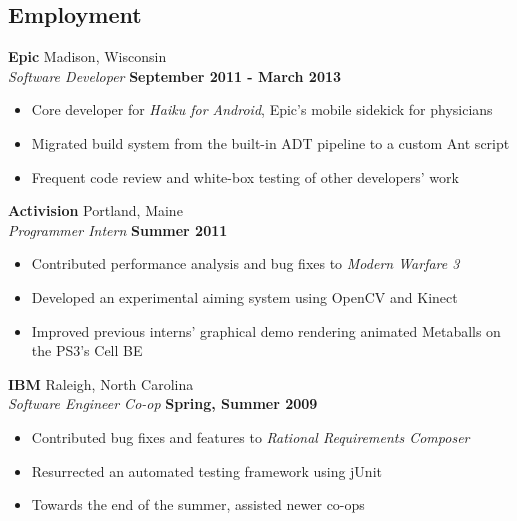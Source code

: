 \documentclass[line,margin]{res}
\begin{document}
 

\address{brendan@luchenlabs.com}
\address{{www.luchenlabs.com}}

                                  
\begin{resume}

 
\section{\sc Employment}
    \textbf{Epic} \hfill Madison, Wisconsin  \\
    \textit{Software Developer} \hfill \textbf{September 2011 - March 2013}
    \vspace{0.05in}
    \begin{itemize}
        \item Core developer for \textit{Haiku for Android}, Epic's mobile sidekick for physicians
        \item Migrated build system from the built-in ADT pipeline to a custom Ant script
        \item Frequent code review and white-box testing of other developers' work
    \end{itemize}

    \textbf{Activision} \hfill Portland, Maine  \\
    \textit{Programmer Intern} \hfill \textbf{Summer 2011}
    \vspace{0.05in}
    \begin{itemize}
        \item Contributed performance analysis and bug fixes to \textit{Modern Warfare 3}
        \item Developed an experimental aiming system using OpenCV and Kinect
        \item Improved previous interns' graphical demo rendering animated Metaballs on the PS3's Cell BE 
    \end{itemize}

    \textbf{IBM} \hfill Raleigh, North Carolina  \\
    \textit{Software Engineer Co-op} \hfill \textbf{Spring, Summer 2009}
    \vspace{0.05in}
    \begin{itemize}
        \item Contributed bug fixes and features to \textit{Rational Requirements Composer}
        \item Resurrected an automated testing framework using jUnit
        \item Towards the end of the summer, assisted newer co-ops 
    \end{itemize}


\end{resume}
\end{document}
